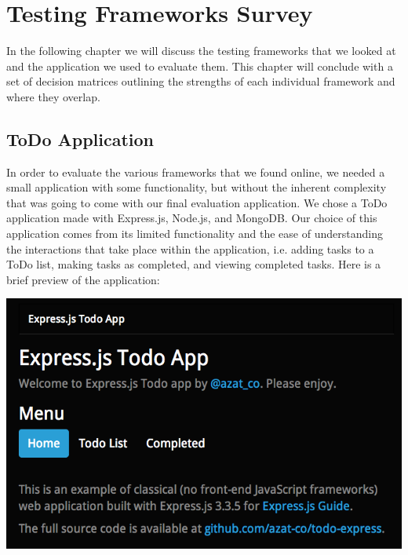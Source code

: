 \documentclass[12pt]{ucthesis}
\newenvironment{Figure}
  {\par\medskip\noindent\minipage{\linewidth}}
  {\endminipage\par\medskip}
\begin{document}
\chapter{Testing Frameworks Survey}
In the following chapter we will discuss the testing frameworks that we looked at and the application we used to evaluate them. This chapter will conclude with a set of decision matrices outlining the strengths of each individual framework and where they overlap.

\section{ToDo Application}
In order to evaluate the various frameworks that we found online, we needed a small application with some functionality, but without the inherent complexity that was going to come with our final evaluation application. We chose a ToDo application made with Express.js, Node.js, and MongoDB. \cite{ToDoAppHomePage} Our choice of this application comes from its limited functionality and the ease of understanding the interactions that take place within the application, i.e. adding tasks to a ToDo list, making tasks as completed, and viewing completed tasks. Here is a brief preview of the application:

\begin{Figure}
  \centering
  \includegraphics[width=0.75\linewidth]{todo_home.png}
  
  
\end{Figure}
\end{document}
